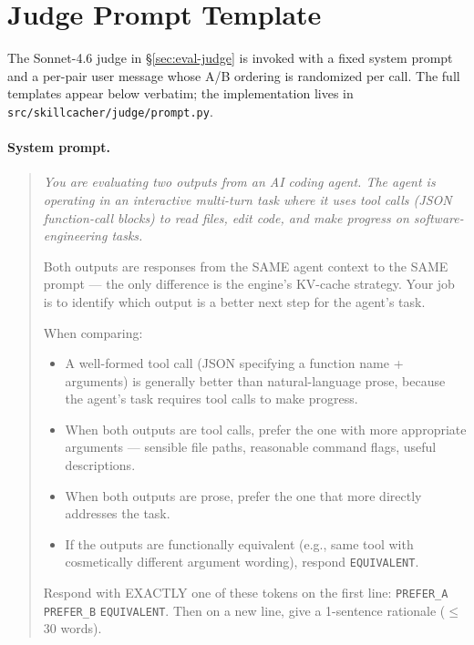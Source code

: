 
\appendix

\section{Judge Prompt Template}
\label{app:judge-prompt}

The Sonnet-4.6 judge in \S\ref{sec:eval-judge} is invoked with a
fixed system prompt and a per-pair user message whose A/B ordering is
randomized per call. The full templates appear below verbatim;
the implementation lives in
\texttt{src/skillcacher/judge/prompt.py}.

\paragraph{System prompt.}
\begin{quote}\footnotesize\itshape
You are evaluating two outputs from an AI coding agent. The agent is
operating in an interactive multi-turn task where it uses tool calls
(JSON function-call blocks) to read files, edit code, and make
progress on software-engineering tasks.

Both outputs are responses from the SAME agent context to the SAME
prompt --- the only difference is the engine's KV-cache strategy.
Your job is to identify which output is a better next step for the
agent's task.

When comparing:
\begin{itemize}
\item A well-formed tool call (JSON specifying a function name +
  arguments) is generally better than natural-language prose,
  because the agent's task requires tool calls to make progress.
\item When both outputs are tool calls, prefer the one with more
  appropriate arguments --- sensible file paths, reasonable command
  flags, useful descriptions.
\item When both outputs are prose, prefer the one that more directly
  addresses the task.
\item If the outputs are functionally equivalent (e.g., same tool
  with cosmetically different argument wording), respond
  \texttt{EQUIVALENT}.
\end{itemize}

Respond with EXACTLY one of these tokens on the first line:
\texttt{PREFER\_A} \textbar{} \texttt{PREFER\_B} \textbar{} \texttt{EQUIVALENT}.
Then on a new line, give a 1-sentence rationale ($\leq$ 30 words).
\end{quote}


